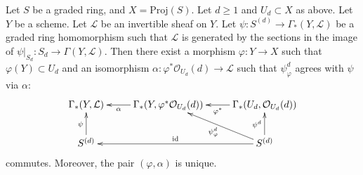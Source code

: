 \begin{lemma}
\label{lemma-converse-construction}
Let $S$ be a graded ring, and $X = \text{Proj}(S)$.
Let $d \geq 1$ and $U_d \subset X$ as above.
Let $Y$ be a scheme.
Let $\mathcal{L}$ be an invertible sheaf on $Y$.
Let $\psi : S^{(d)} \to \Gamma_*(Y, \mathcal{L})$ be
a graded ring homomorphism such that $\mathcal{L}$ is
generated by the sections in the image of
$\psi|_{S_d} : S_d \to \Gamma(Y, \mathcal{L})$.
Then there exist a morphism
$\varphi : Y \to X$ such that $\varphi(Y) \subset U_d$ and
an isomorphism $\alpha : \varphi^*\mathcal{O}_{U_d}(d) \to \mathcal{L}$
such that $\psi_\varphi^d$ agrees with $\psi$ via $\alpha$:
$$
\xymatrix{
\Gamma_*(Y, \mathcal{L}) &
\Gamma_*(Y, \varphi^*\mathcal{O}_{U_d}(d)) \ar[l]^-\alpha &
\Gamma_*(U_d, \mathcal{O}_{U_d}(d)) \ar[l]^-{\varphi^*} \\
S^{(d)} \ar[u]^\psi & &
S^{(d)} \ar[u]^{\psi^d} \ar[ul]^{\psi^d_\varphi} \ar[ll]_{\text{id}}
}
$$
commutes. Moreover, the pair $(\varphi, \alpha)$ is unique.
\end{lemma}

